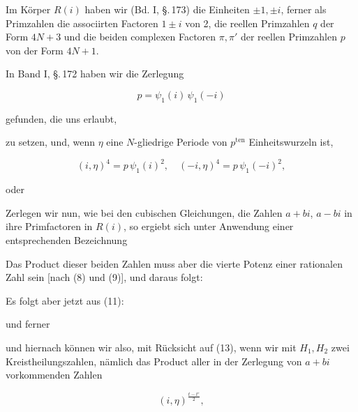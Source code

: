 Im Körper $R(i)$ haben wir (Bd. I, \S.\,173) die Einheiten $\pm 1, \pm i$, ferner
als Primzahlen die associirten Factoren $1\pm i$ von 2, die reellen Primzahlen
$q$ der Form $4N+3$ und die beiden complexen Factoren $\pi, \pi'$ der reellen
Primzahlen $p$ von der Form $4N+1$.

In Band I, \S.\,172 haben wir die Zerlegung

\[
p = \psi_1(i)\,\psi_1(-i)
\]

gefunden, die uns erlaubt,


zu setzen, und, wenn $\eta$ eine $N$-gliedrige Periode von $p^{\text{ten}}$
Einheitswurzeln ist,

\[
(i,\eta)^4 = p\,\psi_1(i)^2, \quad (-i,\eta)^4 = p\,\psi_1(-i)^2,
\]

oder


Zerlegen wir nun, wie bei den cubischen Gleichungen, die Zahlen $a+bi$,
$a-bi$ in ihre Primfactoren in $R(i)$, so ergiebt sich unter Anwendung einer
entsprechenden Bezeichnung


Das Product dieser beiden Zahlen muss aber die vierte Potenz einer rationalen
Zahl sein [nach (8) und (9)], und daraus folgt:


Es folgt aber jetzt aus (11):


und ferner


und hiernach können wir also, mit Rücksicht auf (13), wenn wir mit $H_1, H_2$
zwei Kreistheilungszahlen, nämlich das Product aller in der Zerlegung von
$a+bi$ vorkommenden Zahlen

\[
(i,\eta)^{\frac{t-t'}{2}},
\]
